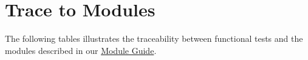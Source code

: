\documentclass[12pt, titlepage]{article}
\begin{document}
\begin{table}[H]
  \centering
  \caption{Traceability Table for Non-Functional Test Cases and Requirements}
  \label{tab:NFRTrace}
\end{table}
		
\section{Trace to Modules}		

The following tables illustrates the traceability between functional  tests and the modules described in our \href{https://github.com/HKanwal/kapstone/blob/main/docs/Design/MG/MG.pdf}{Module Guide}.
\end{document}
